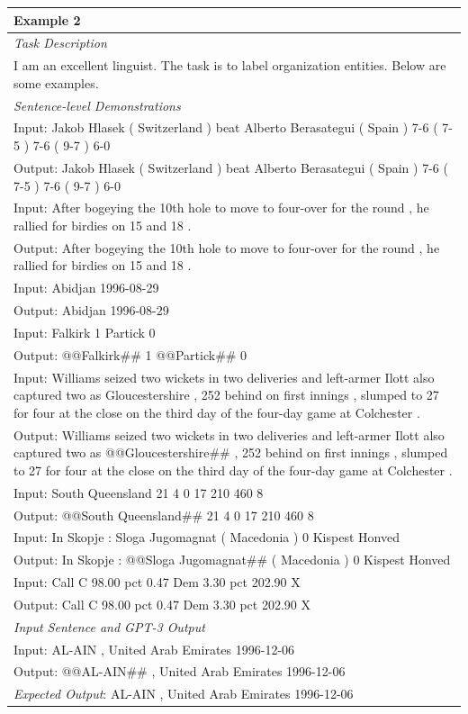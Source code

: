 \documentclass{article}
\begin{document}
\begin{table}[th!]
{\begin{tabular}{l}
\textbf{Example 2} \\\midrule
       	\textit{Task Description} \\
I am an excellent linguist. The task is to label organization entities. Below are some examples. \\\midrule
\textit{Sentence-level Demonstrations} \\
Input: Jakob Hlasek ( Switzerland ) beat Alberto Berasategui ( Spain ) 7-6 ( 7-5 ) 7-6 ( 9-7 ) 6-0 \\
Output: Jakob Hlasek ( Switzerland ) beat Alberto Berasategui ( Spain ) 7-6 ( 7-5 ) 7-6 ( 9-7 ) 6-0 \\
Input: After bogeying the 10th hole to move to four-over for the round , he rallied for birdies on 15 and 18 . \\
Output: After bogeying the 10th hole to move to four-over for the round , he rallied for birdies on 15 and 18 . \\
Input: Abidjan 1996-08-29 \\
Output: Abidjan 1996-08-29 \\
Input: Falkirk 1 Partick 0 \\
Output: @@Falkirk\#\# 1 @@Partick\#\# 0 \\
Input: Williams seized two wickets in two deliveries and left-armer Ilott also captured two as Gloucestershire , 252 behind on first innings , slumped to 27 for four at the close on the third day of the four-day game at Colchester . \\
Output: Williams seized two wickets in two deliveries and left-armer Ilott also captured two as @@Gloucestershire\#\# , 252 behind on first innings , slumped to 27 for four at the close on the third day of the four-day game at Colchester . \\
Input: South Queensland 21 4 0 17 210 460 8 \\
Output: @@South Queensland\#\# 21 4 0 17 210 460 8 \\
Input: In Skopje : Sloga Jugomagnat ( Macedonia ) 0 Kispest Honved \\
Output: In Skopje : @@Sloga Jugomagnat\#\# ( Macedonia ) 0 Kispest Honved \\
Input: Call C 98.00 pct 0.47 Dem 3.30 pct 202.90 X \\
Output: Call C 98.00 pct 0.47 Dem 3.30 pct 202.90 X \\\midrule
\textit{Input Sentence and GPT-3 Output} \\
Input: AL-AIN , United Arab Emirates 1996-12-06 \\
Output: @@AL-AIN\#\# , United Arab Emirates 1996-12-06 \\
{\color{blue}\it Expected Output}: AL-AIN , United Arab Emirates 1996-12-06 \\\bottomrule


\end{tabular}}
\end{table}
\end{document}
